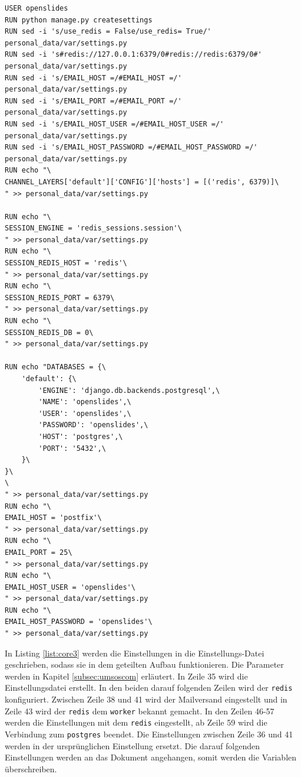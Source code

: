 \documentclass[11pt,a4paper]{article}
\begin{document}
\begin{lstlisting}[firstnumber=34,
	caption=Dockerfile für den Bau des \texttt{core} - Teil 3 \cite{osdockcont},
	label={list:core3}]
USER openslides
RUN python manage.py createsettings
RUN sed -i 's/use_redis = False/use_redis= True/' personal_data/var/settings.py
RUN sed -i 's#redis://127.0.0.1:6379/0#redis://redis:6379/0#' personal_data/var/settings.py
RUN sed -i 's/EMAIL_HOST =/#EMAIL_HOST =/' personal_data/var/settings.py
RUN sed -i 's/EMAIL_PORT =/#EMAIL_PORT =/' personal_data/var/settings.py
RUN sed -i 's/EMAIL_HOST_USER =/#EMAIL_HOST_USER =/' personal_data/var/settings.py
RUN sed -i 's/EMAIL_HOST_PASSWORD =/#EMAIL_HOST_PASSWORD =/' personal_data/var/settings.py
RUN echo "\
CHANNEL_LAYERS['default']['CONFIG']['hosts'] = [('redis', 6379)]\
" >> personal_data/var/settings.py

RUN echo "\
SESSION_ENGINE = 'redis_sessions.session'\
" >> personal_data/var/settings.py
RUN echo "\
SESSION_REDIS_HOST = 'redis'\
" >> personal_data/var/settings.py
RUN echo "\
SESSION_REDIS_PORT = 6379\
" >> personal_data/var/settings.py
RUN echo "\
SESSION_REDIS_DB = 0\
" >> personal_data/var/settings.py

RUN echo "DATABASES = {\ 
	'default': {\
		'ENGINE': 'django.db.backends.postgresql',\
		'NAME': 'openslides',\
		'USER': 'openslides',\
		'PASSWORD': 'openslides',\
		'HOST': 'postgres',\
		'PORT': '5432',\
	}\
}\
\
" >> personal_data/var/settings.py
RUN echo "\
EMAIL_HOST = 'postfix'\
" >> personal_data/var/settings.py
RUN echo "\
EMAIL_PORT = 25\
" >> personal_data/var/settings.py
RUN echo "\
EMAIL_HOST_USER = 'openslides'\
" >> personal_data/var/settings.py
RUN echo "\
EMAIL_HOST_PASSWORD = 'openslides'\
" >> personal_data/var/settings.py
\end{lstlisting}
In Listing \ref{list:core3} werden die Einstellungen in die Einstellungs-Datei 
geschrieben, sodass sie in dem geteilten Aufbau funktionieren. Die Parameter 
werden in Kapitel \ref{subsec:umsoscom} erläutert. In Zeile 35 wird die 
Einstellungsdatei erstellt. In den beiden darauf folgenden Zeilen wird der 
\texttt{redis} konfiguriert. Zwischen Zeile 38 und 41 wird der Mailversand 
eingestellt und in Zeile 43 wird der \texttt{redis} dem \texttt{worker} bekannt 
gemacht. In den Zeilen 46-57 werden die Einstellungen mit dem \texttt{redis} 
eingestellt, ab Zeile 59 wird die Verbindung zum \texttt{postgres} beendet. 
Die Einstellungen zwischen Zeile 36 und 41 werden in der ursprünglichen 
Einstellung ersetzt. Die darauf folgenden Einstellungen werden an das Dokument 
angehangen, somit werden die Variablen überschreiben.
\end{document}
